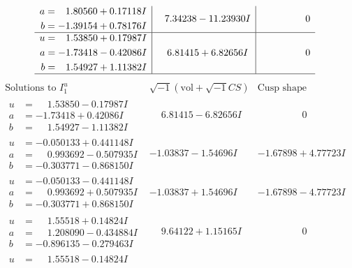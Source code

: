 \documentclass[1p]{elsarticle_modified}
\theoremstyle{definition}
\newcommand{\I}{\sqrt{-1}}
\begin{document}
$$\begin{array}{c|c|c}
\begin{aligned}
a &= \phantom{-}1.80560 + 0.17118 I \\
b &= -1.39154 + 0.78176 I\end{aligned}
 & \phantom{-}7.34238 - 11.23930 I & \phantom{-0.000000 } 0 \\ \hline\begin{aligned}
u &= \phantom{-}1.53850 + 0.17987 I \\
a &= -1.73418 - 0.42086 I \\
b &= \phantom{-}1.54927 + 1.11382 I\end{aligned}
 & \phantom{-}6.81415 + 6.82656 I & \phantom{-0.000000 } 0\\
 \hline 
 \end{array}$$\newpage$$\begin{array}{c|c|c}  
\text{Solutions to }I^u_{1}& \I (\text{vol} + \sqrt{-1}CS) & \text{Cusp shape}\\
 \hline 
\begin{aligned}
u &= \phantom{-}1.53850 - 0.17987 I \\
a &= -1.73418 + 0.42086 I \\
b &= \phantom{-}1.54927 - 1.11382 I\end{aligned}
 & \phantom{-}6.81415 - 6.82656 I & \phantom{-0.000000 } 0 \\ \hline\begin{aligned}
u &= -0.050133 + 0.441148 I \\
a &= \phantom{-}0.993692 - 0.507935 I \\
b &= -0.303771 - 0.868150 I\end{aligned}
 & -1.03837 - 1.54696 I & -1.67898 + 4.77723 I \\ \hline\begin{aligned}
u &= -0.050133 - 0.441148 I \\
a &= \phantom{-}0.993692 + 0.507935 I \\
b &= -0.303771 + 0.868150 I\end{aligned}
 & -1.03837 + 1.54696 I & -1.67898 - 4.77723 I \\ \hline\begin{aligned}
u &= \phantom{-}1.55518 + 0.14824 I \\
a &= \phantom{-}1.208090 - 0.434884 I \\
b &= -0.896135 - 0.279463 I\end{aligned}
 & \phantom{-}9.64122 + 1.15165 I & \phantom{-0.000000 } 0 \\ \hline\begin{aligned}
u &= \phantom{-}1.55518 - 0.14824 I \\

\end{aligned}
\end{array}$$
\end{document}
